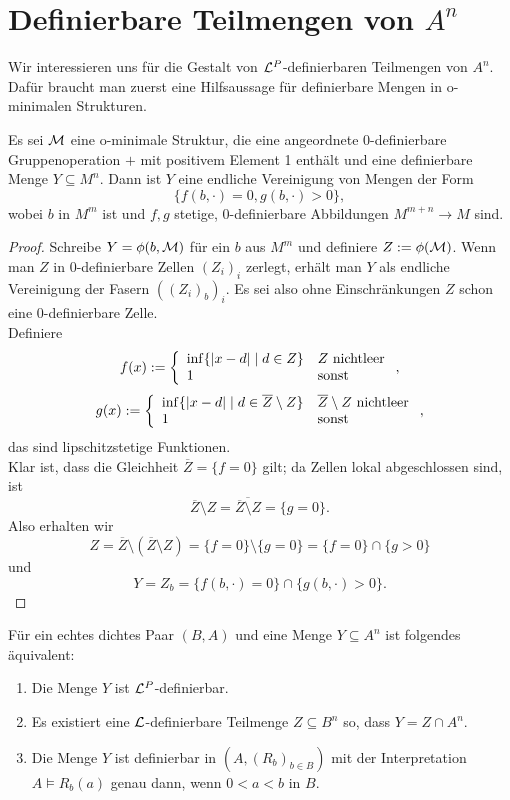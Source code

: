 \section{Definierbare Teilmengen von $A^n$}\label{Definierbare Teilmengen}
Wir interessieren uns für die Gestalt von $\mathcal{L}^P$-definierbaren Teilmengen von $A^n$. Dafür braucht man zuerst eine Hilfsaussage für definierbare Mengen in o-minimalen Strukturen.

\begin{lemma}
	Es sei $\mathcal{M}$ eine o-minimale Struktur, die eine angeordnete 0-definierbare Gruppenoperation $+$ mit positivem Element 1 enthält und eine definierbare Menge $Y\subseteq M^n$. Dann ist $Y$ eine endliche Vereinigung von Mengen der Form $$\{f(b,\cdot)=0,g(b,\cdot)>0\},$$ wobei $b$ in $M^m$ ist und $f,g$ stetige, 0-definierbare Abbildungen $M^{m+n}\rightarrow M$ sind.
\end{lemma}
\begin{proof}
	Schreibe $Y=\phi(b,\mathcal{M})$ für ein $b$ aus $M^m$ und definiere $Z:=\phi(\mathcal{M})$. Wenn man $Z$ in 0-definierbare Zellen $(Z_i)_i$ zerlegt, erhält man $Y$ als endliche Vereinigung der Fasern $((Z_i)_b)_i$.  Es sei also ohne Einschränkungen $Z$ schon eine 0-definierbare Zelle.\\
	Definiere $$f(x):=\left\{\begin{array}{ll}
	\inf\{{\left| x-d \right|}\mid d\in Z\}&Z\text{ nichtleer}\\
	1&\text{sonst}
	\end{array}\right.,$$
	$$g(x):=\left\{\begin{array}{ll}
	\inf\{{\left| x-d \right|}\mid d\in \overline{Z}\setminus Z\}&\overline{Z}\setminus Z\text{ nichtleer}\\
	1&\text{sonst}
	\end{array}\right.,$$ das sind lipschitzstetige Funktionen.\\
	Klar ist, dass die Gleichheit $\overline{Z}=\{f=0\}$ gilt; da Zellen lokal abgeschlossen sind, ist $$\overline{Z}\setminus Z=\overline{\overline{Z}\setminus Z}=\{g=0\}.$$ Also erhalten wir $$Z=\overline{Z}\setminus(\overline{Z}\setminus Z)=\{f=0\}\setminus\{g=0\}=\{f=0\}\cap\{g>0\}$$ und $$Y=Z_b=\{f(b,\cdot)=0\}\cap\{g(b,\cdot)>0\}.$$
\end{proof}
\newpage
\begin{theorem}\label{Definierbare Mengen}
	Für ein echtes dichtes Paar $(B,A)$ und eine Menge $Y\subseteq A^n$ ist folgendes äquivalent:
	\begin{enumerate}
		\item Die Menge $Y$ ist $\mathcal{L}^P$-definierbar.
		\item Es existiert eine $\mathcal{L}$-definierbare Teilmenge $Z\subseteq B^n$ so, dass $Y=Z\cap A^n$.
		\item Die Menge $Y$ ist definierbar in $(A,(R_b)_{b\in B})$ mit der Interpretation $A\models R_b(a)$ genau dann, wenn $0<a<b$ in $B$.
	\end{enumerate}
\end{theorem}
